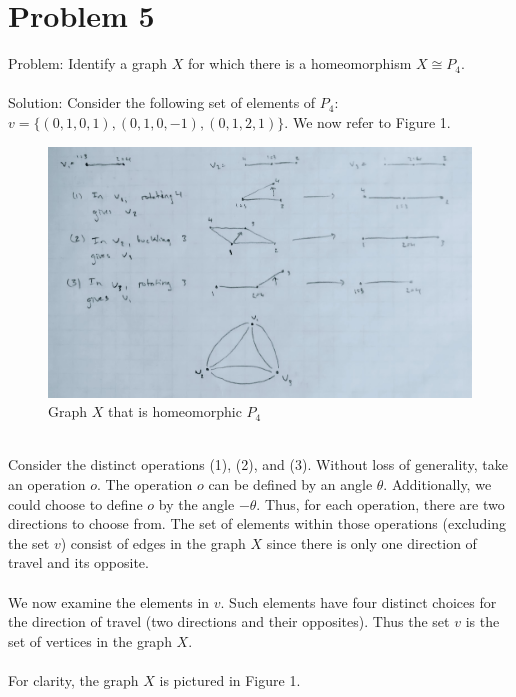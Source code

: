 \documentclass{article}
\begin{document}
\newpage

\section*{Problem 5}
Problem: Identify a graph $X$ for which there is a homeomorphism $X \cong P_4$. \\\\
Solution: Consider the following set of elements of $P_4$:
$v = \{ (0,1,0,1), (0,1,0,-1), (0,1,2,1) \}$.
We now refer to Figure 1. 
\begin{figure}[h]
	\centering
	\includegraphics[width=5in]{P-sub-4-graph.png}
	\caption{Graph $X$ that is homeomorphic $P_4$}
\end{figure} \\
Consider the distinct operations (1), (2), and (3). Without loss of generality, take an operation $o$. The operation $o$ can be defined by an angle $\theta$.
Additionally, we could choose to define $o$ by the angle $- \theta$. Thus, for each operation, there are two directions to choose from.
The set of elements within those operations (excluding the set $v$) consist of edges in the graph $X$ since there is only one direction of travel and its opposite. \\\\
We now examine the elements in $v$. Such elements have four distinct choices for the direction of travel (two directions and their opposites). Thus the set $v$ is the set of vertices in the graph $X$. \\\\
For clarity, the graph $X$ is pictured in Figure 1.
\end{document}

